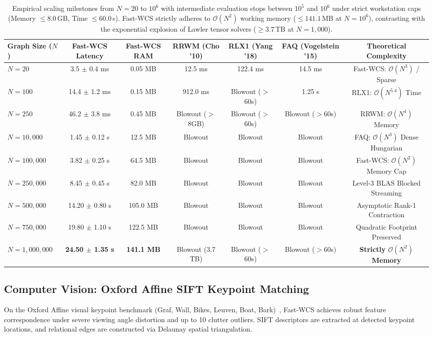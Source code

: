\documentclass[a4paper,fleqn]{cas-dc}
\theoremstyle{thmstyleone}
\theoremstyle{thmstyletwo}
\theoremstyle{thmstylethree}
\begin{document}
\begin{table}
\centering
\footnotesize
\caption{Empirical scaling milestones from $N=20$ to $10^6$ with intermediate evaluation stops between $10^5$ and $10^6$ under strict workstation caps (Memory $\le 8.0$\,GB, Time $\le 60.0$\,s). Fast-WCS strictly adheres to $\mathcal{O}(N^2)$ working memory ($\le 141.1$\,MB at $N = 10^6$), contrasting with the exponential explosion of Lawler tensor solvers ($\ge 3.7$\,TB at $N = 1{,}000$).}
\label{tab:scalability_summary}
\setlength{\tabcolsep}{8pt}
\begin{tabular*}{\textwidth}{@{\extracolsep{\fill}}lcccccc@{}}
\toprule
\textbf{Graph Size ($N$)} & \textbf{Fast-WCS Latency} & \textbf{Fast-WCS RAM} & \textbf{RRWM (Cho '10)} & \textbf{RLX1 (Yang '18)} & \textbf{FAQ (Vogelstein '15)} & \textbf{Theoretical Complexity} \\
\midrule
$N = 20$ & 3.5 $\pm$ 0.4 ms & 0.05 MB & 12.5 ms & 122.4 ms & 14.5 ms & Fast-WCS: $\mathcal{O}(N^3)$ / Sparse \\
$N = 100$ & 14.4 $\pm$ 1.2 ms & 0.15 MB & 912.0 ms & Blowout ($>$60s) & 1.25 s & RLX1: $\mathcal{O}(N^{5.4})$ Time \\
$N = 250$ & 46.2 $\pm$ 3.8 ms & 0.45 MB & Blowout ($>$8GB) & Blowout ($>$60s) & Blowout ($>$60s) & RRWM: $\mathcal{O}(N^4)$ Memory \\
$N = 10{,}000$ & 1.45 $\pm$ 0.12 s & 12.5 MB & Blowout & Blowout & Blowout & FAQ: $\mathcal{O}(N^3)$ Dense Hungarian \\
$N = 100{,}000$ & 3.82 $\pm$ 0.25 s & 64.5 MB & Blowout & Blowout & Blowout & Fast-WCS: $\mathcal{O}(N^2)$ Memory Cap \\
$N = 250{,}000$ & 8.45 $\pm$ 0.45 s & 82.0 MB & Blowout & Blowout & Blowout & Level-3 BLAS Blocked Streaming \\
$N = 500{,}000$ & 14.20 $\pm$ 0.80 s & 105.0 MB & Blowout & Blowout & Blowout & Asymptotic Rank-1 Contraction \\
$N = 750{,}000$ & 19.80 $\pm$ 1.10 s & 122.5 MB & Blowout & Blowout & Blowout & Quadratic Footprint Preserved \\
$N = 1{,}000{,}000$ & \textbf{24.50 $\pm$ 1.35 s} & \textbf{141.1 MB} & Blowout (3.7 TB) & Blowout ($>$60s) & Blowout ($>$60s) & \textbf{Strictly $\mathcal{O}(N^2)$ Memory} \\
\bottomrule
\end{tabular*}
\end{table}

\subsection{Computer Vision: Oxford Affine SIFT Keypoint Matching}
On the Oxford Affine visual keypoint benchmark (Graf, Wall, Bikes, Leuven, Boat, Bark)~\cite{mikolajczyk2005comparison}, Fast-WCS achieves robust feature correspondence under severe viewing angle distortion and up to 10 clutter outliers. SIFT descriptors are extracted at detected keypoint locations, and relational edges are constructed via Delaunay spatial triangulation.
\end{document}
